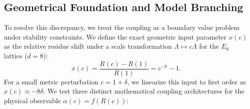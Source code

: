 \documentclass[11pt,a4paper]{article}
\theoremstyle{definition}
\begin{document}
	\subsection{Geometrical Foundation and Model Branching}
	To resolve this discrepancy, we treat the coupling as a boundary value problem under stability constraints. We define the exact geometric input parameter $x(c)$ as the relative residue shift under a scale transformation $\Lambda \mapsto c\Lambda$ for the $E_8$ lattice ($d=8$):
	\begin{equation}
		x(c) = \frac{R(c)-R(1)}{R(1)} = c^{-8} - 1.
	\end{equation}
	For a small metric perturbation $c = 1 + \delta$, we linearize this input to first order as $x(c) \approx -8\delta$. We test three distinct mathematical coupling architectures for the physical observable $\alpha(c) = f(R(c))$:
	
\end{document}
